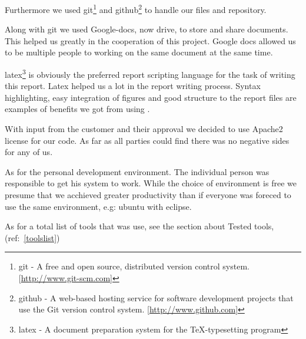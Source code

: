     Furthermore we used \gls{git}\footnote{\gls{git} - A free and open source, distributed version control system. [\url{http://www.git-scm.com}]} and \gls{github}\footnote{\gls{github} - A web-based hosting service for software development projects that use the Git version control system. [\url{http://www.github.com}]} to handle our files and repository. 
    
    Along with git we used Google-docs, now drive, to store and share documents. This helped us greatly in the cooperation of this project. Google docs allowed us to be multiple people to working on the same document at the same time. 
    
    \gls{latex}\footnote{\gls{latex} - A document preparation system for the \TeX -typesetting program} is obviously the preferred report scripting language for the task of writing this report. Latex helped us a lot in the report writing process. Syntax highlighting, easy integration of figures and good structure to the report files are examples of benefits we got from using \Tex.
    
    With input from the customer and their approval we decided to use Apache2 license for our code. As far as all parties could find there was no negative sides for any of us. 

    As for the personal development environment. The individual person was responsible to get his system to work. While the choice of environment is free we presume that we acchieved greater productivity than if everyone was foreced to use the same environment, e.g: ubuntu with eclipse.  

    As for a total list of tools that was use, see the section about Tested tools, (ref:~\ref{toolslist})    
    
